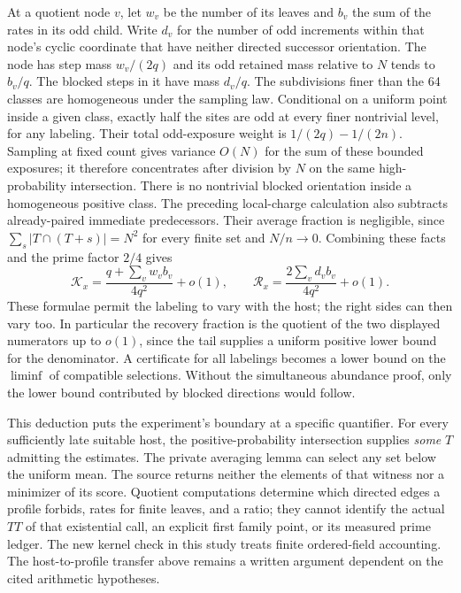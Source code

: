 \documentclass[12pt,letterpaper]{article}
\begin{document}
At a quotient node \(v\), let \(w_v\) be the number of its leaves and \(b_v\) the sum of the rates in its odd child. Write \(d_v\) for the number of odd increments within that node's cyclic coordinate that have neither directed successor orientation. The node has step mass \(w_v/(2q)\) and its odd retained mass relative to \(N\) tends to \(b_v/q\). The blocked steps in it have mass \(d_v/q\). The subdivisions finer than the 64 classes are homogeneous under the sampling law. Conditional on a uniform point inside a given class, exactly half the sites are odd at every finer nontrivial level, for any labeling. Their total odd-exposure weight is \(1/(2q)-1/(2n)\). Sampling at fixed count gives variance \(O(N)\) for the sum of these bounded exposures; it therefore concentrates after division by \(N\) on the same high-probability intersection. There is no nontrivial blocked orientation inside a homogeneous positive class. The preceding local-charge calculation also subtracts already-paired immediate predecessors. Their average fraction is negligible, since \(\sum_s|T\cap(T+s)|=N^2\) for every finite set and \(N/n\to0\). Combining these facts and the prime factor \(2/4\) gives
\[
 \mathcal K_x=\frac{q+\sum_v w_v b_v}{4q^2}+o(1),
 \qquad
 \mathcal R_x=\frac{2\sum_v d_v b_v}{4q^2}+o(1).
\]
These formulae permit the labeling to vary with the host; the right sides can then vary too. In particular the recovery fraction is the quotient of the two displayed numerators up to \(o(1)\), since the tail supplies a uniform positive lower bound for the denominator. A certificate for all labelings becomes a lower bound on the \(\liminf\) of compatible selections. Without the simultaneous abundance proof, only the lower bound contributed by blocked directions would follow.

This deduction puts the experiment's boundary at a specific quantifier. For every sufficiently late suitable host, the positive-probability intersection supplies \emph{some} \(T\) admitting the estimates. The private averaging lemma can select any set below the uniform mean. The source returns neither the elements of that witness nor a minimizer of its score. Quotient computations determine which directed edges a profile forbids, rates for finite leaves, and a ratio; they cannot identify the actual \(TT\) of that existential call, an explicit first family point, or its measured prime ledger. The new kernel check in this study treats finite ordered-field accounting. The host-to-profile transfer above remains a written argument dependent on the cited arithmetic hypotheses.
\end{document}
